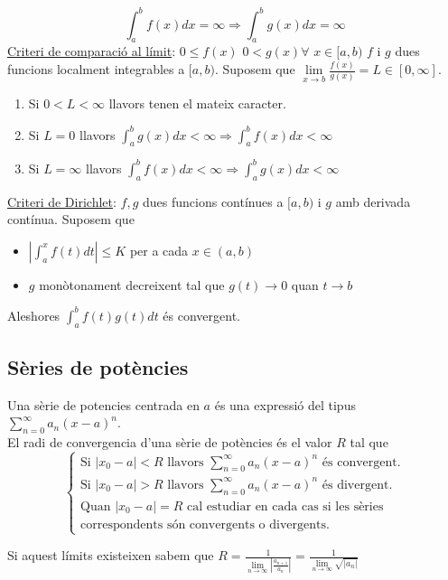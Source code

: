 \begin{displaymath}
    \int_a^b f(x)dx = \infty \Rightarrow \int_a^b g(x) dx = \infty
\end{displaymath}
\underline{Criteri de comparació al límit}: $0 \leq f(x)$ $0 < g(x) \forall$ $x \in [a, b)$ $f$ i $g$ dues funcions localment integrables a $[a, b)$. Suposem que $\lim\limits_{x \rightarrow b} \frac{f(x)}{g(x)} = L \in [0, \infty]$.\\
\begin{enumerate}
    \item Si $0 < L < \infty$ llavors tenen el mateix caracter.
    \item Si $L = 0$ llavors $\int_a^b g(x) dx < \infty \Rightarrow \int_a^b f(x) dx < \infty$
    \item Si $L = \infty$ llavors $\int_a^b f(x) dx < \infty \Rightarrow \int_a^b g(x) dx < \infty$
\end{enumerate}
\underline{Criteri de Dirichlet}: $f, g$ dues funcions contínues a $[a, b)$ i $g$ amb derivada contínua. Suposem que \begin{itemize}
    \item $|\int_a^x f(t) dt| \leq K$ per a cada $x \in (a, b)$
    \item $g$ monòtonament decreixent tal que $g(t) \longrightarrow 0$ quan $t \rightarrow b$
\end{itemize}
Aleshores $\int_a^b f(t) g(t) dt$ és convergent.\\
\subsection{Sèries de potències}
Una sèrie de potencies centrada en $a$ és una expressió del tipus $\sum\limits_{n=0}^\infty a_n(x-a)^n$.\\
El radi de convergencia d'una sèrie de potències és el valor $R$ tal que
\begin{displaymath}\begin{cases}
    \text{Si } |x_0 - a| < R \text{ llavors } \sum\limits_{n=0}^\infty a_n(x-a)^n \text{ és convergent.}\\
    \text{Si } |x_0 - a| > R \text{ llavors } \sum\limits_{n=0}^\infty a_n(x-a)^n \text{ és divergent.}\\
    \text{Quan } |x_0 - a| = R \text{ cal estudiar en cada cas si les sèries}\\
    \text{correspondents són convergents o divergents.}
\end{cases}\end{displaymath}

Si aquest límits existeixen sabem que $R = \frac{1}{\lim\limits_{n\rightarrow \infty} |\frac{a_{n+1}}{a_n}|} = \frac{1}{\lim\limits_{n\rightarrow \infty} \sqrt{|a_n|}}$
\newpage